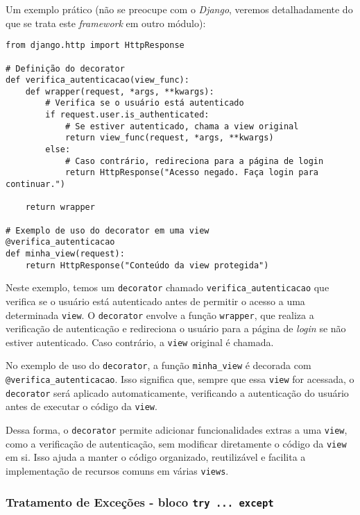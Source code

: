 \documentclass[a4paper, 12pt, onecolumn,singlespacing]{article}
\begin{document}
Um exemplo prático (não se preocupe com o \textit{Django}, veremos detalhadamente do que se trata este \textit{framework} em outro módulo):

\begin{verbatim}
from django.http import HttpResponse

# Definição do decorator
def verifica_autenticacao(view_func):
	def wrapper(request, *args, **kwargs):
		# Verifica se o usuário está autenticado
		if request.user.is_authenticated:
			# Se estiver autenticado, chama a view original
			return view_func(request, *args, **kwargs)
		else:
			# Caso contrário, redireciona para a página de login
			return HttpResponse("Acesso negado. Faça login para continuar.")

	return wrapper

# Exemplo de uso do decorator em uma view
@verifica_autenticacao
def minha_view(request):
	return HttpResponse("Conteúdo da view protegida")
\end{verbatim}

Neste exemplo, temos um \texttt{decorator} chamado \texttt{verifica\_autenticacao} que verifica se o usuário está autenticado antes de permitir o acesso a uma determinada \texttt{view}. O \texttt{decorator} envolve a função \texttt{wrapper}, que realiza a verificação de autenticação e redireciona o usuário para a página de \textit{login} se não estiver autenticado. Caso contrário, a \texttt{view} original é chamada.

No exemplo de uso do \texttt{decorator}, a função \texttt{minha\_view} é decorada com \texttt{@verifica\_autenticacao}. Isso significa que, sempre que essa \texttt{view} for acessada, o \texttt{decorator} será aplicado automaticamente, verificando a autenticação do usuário antes de executar o código da \texttt{view}.

Dessa forma, o \texttt{decorator} permite adicionar funcionalidades extras a uma \texttt{view}, como a verificação de autenticação, sem modificar diretamente o código da \texttt{view} em si. Isso ajuda a manter o código organizado, reutilizável e facilita a implementação de recursos comuns em várias \texttt{views}.

	\subsubsection{Tratamento de Exceções - bloco \texttt{try ... except}}
	
\end{document}
